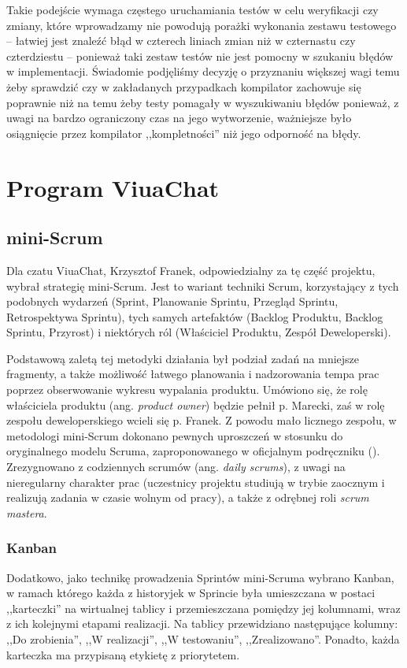 Takie podejście wymaga częstego uruchamiania testów w celu weryfikacji czy
zmiany, które wprowadzamy nie powodują porażki wykonania zestawu testowego --
łatwiej jest znaleźć błąd w czterech liniach zmian niż w czternastu czy
czterdziestu -- ponieważ taki zestaw testów nie jest pomocny w szukaniu błędów w
implementacji. Świadomie podjęliśmy decyzję o przyznaniu większej wagi temu żeby
sprawdzić czy w zakładanych przypadkach kompilator zachowuje się poprawnie niż
na temu żeby testy pomagały w wyszukiwaniu błędów ponieważ, z uwagi na bardzo
ograniczony czas na jego wytworzenie, ważniejsze było osiągnięcie przez
kompilator ,,kompletności'' niż jego odporność na błędy.

\section{Program ViuaChat}

\subsection{mini-Scrum}
Dla czatu ViuaChat, Krzysztof Franek, odpowiedzialny za tę część projektu, wybrał strategię mini-Scrum. Jest to
wariant techniki Scrum, korzystający z tych podobnych wydarzeń (Sprint, Planowanie Sprintu, Przegląd Sprintu,
Retrospektywa Sprintu), tych samych artefaktów (Backlog Produktu, Backlog Sprintu, Przyrost) i niektórych ról
(Właściciel Produktu, Zespół Deweloperski).

Podstawową zaletą tej metodyki działania był podział zadań na mniejsze fragmenty, a także możliwość łatwego
planowania i nadzorowania tempa prac poprzez obserwowanie wykresu wypalania produktu. Umówiono się, że rolę
właściciela produktu (ang. \textit{product owner}) będzie pełnił p. Marecki, zaś w rolę zespołu deweloperskiego
wcieli się p. Franek. Z powodu mało licznego zespołu, w metodologi mini-Scrum dokonano pewnych uproszczeń w
stosunku do oryginalnego modelu Scruma, zaproponowanego w oficjalnym podręczniku (\cite{Scrum}). Zrezygnowano
z codziennych scrumów (ang. \textit{daily scrums}), z uwagi na nieregularny charakter prac (uczestnicy projektu
studiują w trybie zaocznym i realizują zadania w czasie wolnym od pracy), a także z odrębnej roli \textit{scrum
mastera}.

\subsubsection{Kanban}
Dodatkowo, jako technikę prowadzenia Sprintów mini-Scruma wybrano Kanban, w ramach którego każda z historyjek
w Sprincie była umieszczana w postaci ,,karteczki'' na wirtualnej tablicy i przemieszczana pomiędzy jej kolumnami,
wraz z ich kolejnymi etapami realizacji. Na tablicy przewidziano następujące kolumny: ,,Do zrobienia'', ,,W
realizacji'', ,,W testowaniu'', ,,Zrealizowano''. Ponadto, każda karteczka ma przypisaną etykietę z priorytetem.

